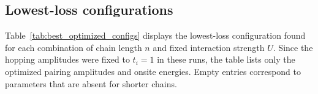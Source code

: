 
\subsection{Lowest-loss configurations}
Table~\ref{tab:best_optimized_configs} displays the lowest-loss configuration found for each combination of chain length $n$ and fixed interaction strength $U$. Since the hopping amplitudes were fixed to $t_i=1$ in these runs, the table lists only the optimized pairing amplitudes and onsite energies. Empty entries correspond to parameters that are absent for shorter chains.

